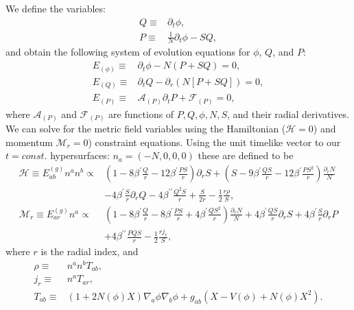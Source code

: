 \documentclass[a4paper,11pt]{article}
\begin{document}
   We define the variables:
\begin{subequations}
\begin{align}
   Q
   \equiv&
   \partial_t\phi
   ,\\
   P
   \equiv&
   \frac{1}{N}\partial_t\phi-S Q
   ,
\end{align}
\end{subequations}
   and obtain the following system of evolution equations for
$\phi$, $Q$, and $P$:
\begin{subequations}
\begin{align}
   E_{(\phi)}
   \equiv&
   \partial_t\phi
-  N\left(P+S Q\right)
   = 0
   ,\\
   E_{(Q)}
   \equiv&
   \partial_tQ
-  \partial_r\left(N\left[P+S Q\right]\right)
   = 0
   ,\\
   E_{(P)}
   \equiv&
   \mathcal{A}_{(P)}\partial_tP
+  \mathcal{F}_{(P)}
   = 0
   ,
\end{align}
\end{subequations}
   where $\mathcal{A}_{(P)}$ and $\mathcal{F}_{(P)}$
are functions of $P,Q,\phi,N,S$, and their radial derivatives. 
We can solve for the metric field variables using the
Hamiltonian ($\mathcal{H}=0$) and momentum $\mathcal{M}_r=0$)
constraint equations.
Using the unit timelike vector to our $t=const.$ hypersurfaces:
$n_a=(-N,0,0,0)$ these are defined to be 
\begin{align}
\label{eq:metric_field_odes}
   \mathcal{H}
   \equiv
   E^{(g)}_{ab}n^an^b
   \propto&
   \left(
      1
   -  8\beta^{\prime}\frac{Q}{r}
   -  12\beta^{\prime}\frac{P S}{r}
   \right)
   \partial_rS
+  \left(
      S
   -  9\beta^{\prime}\frac{QS}{r}
   -  12\beta^{\prime}\frac{PS^2}{r}
   \right)
   \frac{\partial_rN}{N}
   \nonumber\\&
-  4\beta^{\prime}\frac{S}{r}\partial_rQ  
-  4\beta^{\prime\prime}\frac{Q^2S}{r}
+  \frac{S}{2r}
-  \frac{1}{2}\frac{r\rho}{S}
   ,\\
   \mathcal{M}_r
   \equiv
   E^{(g)}_{ar}n^a
   \propto&
   \left(
      1
   -  8\beta^{\prime}\frac{Q}{r}
   -  8\beta^{\prime}\frac{PS}{r}
   +  4\beta^{\prime}\frac{QS^2}{r}
   \right)
   \frac{\partial_rN}{N}
+  4\beta^{\prime}\frac{QS}{r}\partial_rS
+  4\beta^{\prime}\frac{S}{r}\partial_rP
   \nonumber\\&
+  4\beta^{\prime\prime}\frac{P Q S}{r}
-  \frac{1}{2}\frac{r j_r}{S}
   ,
\end{align}
   where $r$ is the radial index, and
\begin{subequations}
\begin{align}
   \rho
   \equiv&
   n^an^bT_{ab}
   ,\\
   j_r
   \equiv&
   n^aT_{ar}
   ,\\
   T_{ab}
   \equiv&
   \left(
      1+ 2 N\left(\phi\right)X
   \right)
   \nabla_a\phi\nabla_b\phi
+  g_{ab}
   \left(
      X
   -  V\left(\phi\right) 
   +  N\left(\phi\right) X^2
   \right)
   .
\end{align}
\end{subequations}
\end{document}
